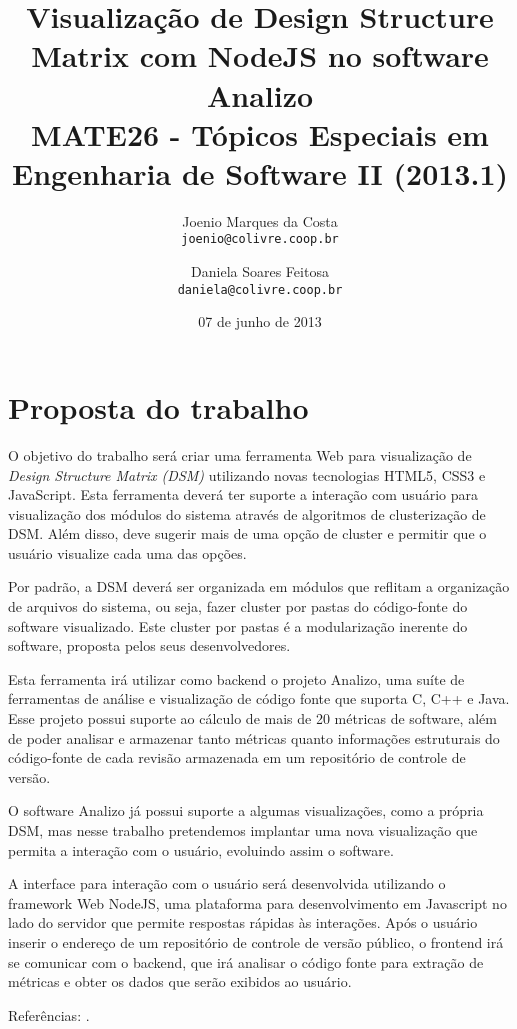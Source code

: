 \documentclass{article}
\title{Visualização de Design Structure Matrix com NodeJS no software
Analizo\\
 \large MATE26 - Tópicos Especiais em Engenharia de Software II (2013.1)}
\author{
  Joenio Marques da Costa\\
  \texttt{joenio@colivre.coop.br}
  \and
  Daniela Soares Feitosa\\
  \texttt{daniela@colivre.coop.br}
}
\date{07 de junho de 2013}
\begin{document}
\maketitle

\section*{Proposta do trabalho}

O objetivo do trabalho será criar uma ferramenta Web para visualização
de {\it Design Structure Matrix (DSM)} utilizando novas tecnologias HTML5,
CSS3  e JavaScript. Esta ferramenta deverá ter suporte a interação com
usuário para visualização dos módulos do sistema através de algoritmos
de clusterização de DSM. Além disso, deve sugerir mais de uma opção de
cluster e permitir que o usuário visualize cada uma das opções.

Por padrão, a DSM deverá ser organizada em módulos que reflitam a organização de
arquivos do sistema, ou seja, fazer cluster por pastas do código-fonte do software
visualizado. Este cluster por pastas é a modularização inerente do software,
proposta pelos seus desenvolvedores.

Esta ferramenta irá utilizar como backend o projeto Analizo, uma suíte
de ferramentas de análise e visualização de código fonte que suporta C,
C++ e Java. Esse projeto possui suporte ao cálculo de mais de 20
métricas de software, além de poder analisar e armazenar tanto métricas
quanto informações estruturais do código-fonte de cada revisão
armazenada em um repositório de controle de versão.

O software Analizo já possui suporte a algumas visualizações, como a
própria DSM, mas nesse trabalho pretendemos implantar uma nova
visualização que permita a interação com o usuário, evoluindo assim o
software.

A interface para interação com o usuário será desenvolvida utilizando o
framework Web NodeJS, uma plataforma para desenvolvimento em Javascript
no lado do servidor que permite respostas rápidas às interações. Após o
usuário inserir o endereço de um repositório de controle de versão
público, o frontend irá se comunicar com o backend, que irá analisar o
código fonte para extração de métricas e obter os dados que serão
exibidos ao usuário.

Referências:
\cite{AKnowledgeBased,AModelBasedMethod,AnalyzingTheEvolution,AntaresDSM,ApplyingTheDesign,DependencyModel,DesignSuite,EfficientOrganizing,ExploringStructure,PredictingChange,PredictingRequirementChange,ReachabilityMatrices,TheStructureAndValue,UsingTheDesignStructure}.


\end{document}
